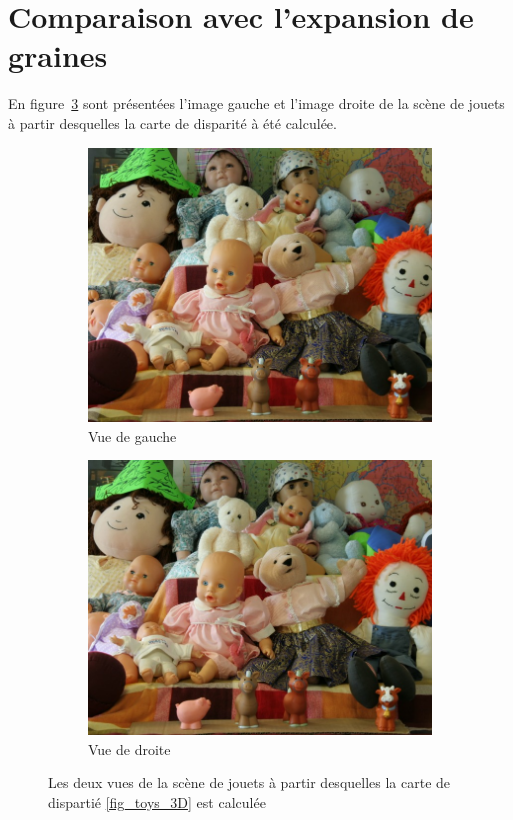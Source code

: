 \documentclass[12pt,a4paper,onecolumn]{article}
\begin{document}
\section{Comparaison avec l'expansion de graines}


En figure~\ref{fig_toys_initial} sont présentées l'image gauche et l'image droite de la scène de jouets à partir desquelles la carte de disparité à été calculée.

\begin{figure}[H]
	\centering
	\begin{subfigure}[b]{0.45\textwidth}
		\centering
		\includegraphics[width = \textwidth]{toys01}
		\caption{Vue de gauche}
		\label{fig_toys_1}
	\end{subfigure}
	\centering
	\begin{subfigure}[b]{0.45\textwidth}
		\centering
		\includegraphics[width = \textwidth]{toys02}
		\caption{Vue de droite}
		\label{fig_toys_2}
	\end{subfigure}
	\caption{Les deux vues de la scène de jouets à partir desquelles la carte de dispartié \ref{fig_toys_3D} est calculée}
	\label{fig_toys_initial}
\end{figure}
\end{document}
